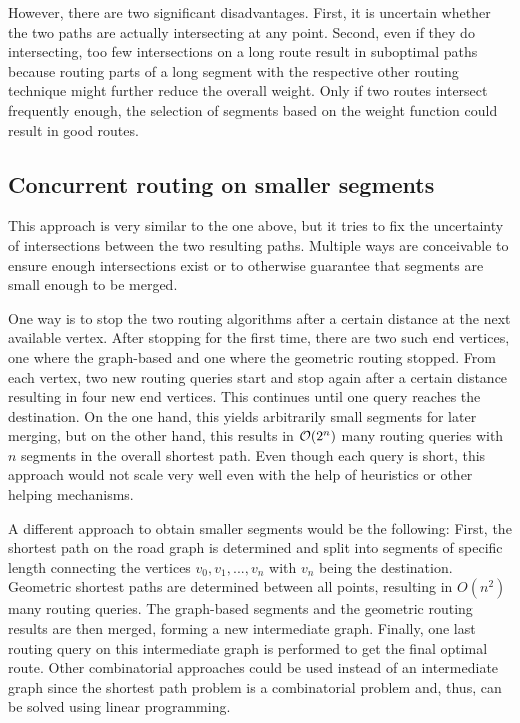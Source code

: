 		However, there are two significant disadvantages.
		First, it is uncertain whether the two paths are actually intersecting at any point.
		Second, even if they do intersecting, too few intersections on a long route result in suboptimal paths because routing parts of a long segment with the respective other routing technique might further reduce the overall weight.
		Only if two routes intersect frequently enough, the selection of segments based on the weight function could result in good routes.
	
	\subsection{Concurrent routing on smaller segments}
	
		This approach is very similar to the one above, but it tries to fix the uncertainty of intersections between the two resulting paths.
		Multiple ways are conceivable to ensure enough intersections exist or to otherwise guarantee that segments are small enough to be merged.
		
		One way is to stop the two routing algorithms after a certain distance at the next available vertex.
		After stopping for the first time, there are two such end vertices, one where the graph-based and one where the geometric routing stopped.
		From each vertex, two new routing queries start and stop again after a certain distance resulting in four new end vertices.
		This continues until one query reaches the destination.
		On the one hand, this yields arbitrarily small segments for later merging, but on the other hand, this results in $\mathcal{O}(2^n)$ many routing queries with $n$ segments in the overall shortest path.
		Even though each query is short, this approach would not scale very well even with the help of heuristics or other helping mechanisms.
		
		A different approach to obtain smaller segments would be the following:
		First, the shortest path on the road graph is determined and split into segments of specific length connecting the vertices $v_0, v_1, ..., v_n$ with $v_n$ being the destination.
		Geometric shortest paths are determined between all points, resulting in $O(n^2)$ many routing queries.
		The graph-based segments and the geometric routing results are then merged, forming a new intermediate graph.
		Finally, one last routing query on this intermediate graph is performed to get the final optimal route.
		Other combinatorial approaches could be used instead of an intermediate graph since the shortest path problem is a combinatorial problem and, thus, can be solved using linear programming\cite{handler-zang-lp-duality}.
		

